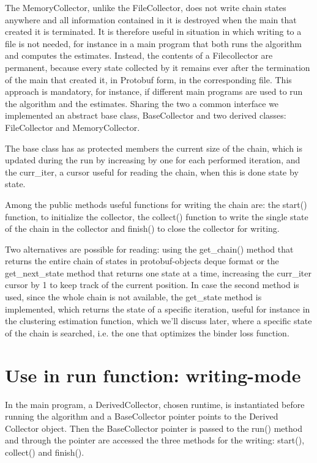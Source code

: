 The MemoryCollector, unlike the FileCollector, does not write chain states anywhere and all information contained in it is destroyed when the main that created it is terminated. It is therefore useful in situation in which writing to a file is not needed, for instance in a main program that both runs the algorithm and computes the estimates.
Instead, the contents of a Filecollector are permanent, because every state collected by it remains ever after the termination of the main that created it, in Protobuf form, in the corresponding file. This approach is mandatory, for instance, if different main programs are used to run the algorithm and the estimates. 
Sharing the two a common interface we implemented an abstract base class, BaseCollector and two derived classes: FileCollector and MemoryCollector.

The base class has as protected members the current size of the chain, which is updated during the run by increasing by one for each performed  iteration, and the curr\_iter, a cursor useful for reading the chain, when this is done state by state.

Among the public methods useful functions for writing the chain are: the start() function, to initialize the collector, the collect() function to write the single state of the chain in the collector and finish() to close the collector for writing. 

Two alternatives are possible for reading: using the get\_chain() method that returns the entire chain of states in protobuf-objects deque format or the get\_next\_state method that returns one state at a time, increasing the curr\_iter cursor by 1 to keep track of the current position. In case the second method is used, since the whole chain is not available, the get\_state method is implemented, which returns the state of a specific iteration, useful for instance in the clustering estimation function, which we'll discuss later, where a specific state of the chain is searched, i.e. the one that optimizes the binder loss function.

\section{Use in run function: writing-mode}
In the main program, a DerivedCollector, chosen runtime, is instantiated before running the algorithm and a BaseCollector pointer points to the Derived Collector object.
Then the BaseCollector pointer is passed to the run() method and through the pointer are accessed the three methods for the writing: start(), collect() and finish().

